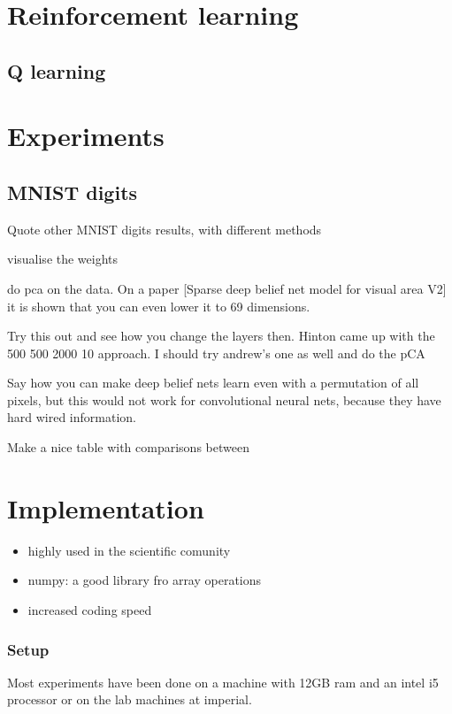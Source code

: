 \documentclass[11pt, fleqn, twoside]{article}
\begin{document}
\section{Reinforcement learning}

\subsection{Q learning}

\section{Experiments}

\subsection{MNIST digits}
  Quote other MNIST digits results, with different methods

  visualise the weights

  do pca on the data. On a paper [Sparse deep belief net model for visual area V2]
  it is shown that you can even lower it to 69 dimensions.

  Try this out and see how you change the layers then.
  Hinton came up with the 500 500 2000 10 approach.
  I should try andrew's one as well and do the pCA

  Say how you can make deep belief nets learn even with a permutation of all pixels, but this would not work for convolutional neural nets, because they have hard wired information.

  Make a nice table with comparisons between

\section{Implementation}

\begin{itemize}
  \item highly used in the scientific comunity
  \item numpy: a good library fro array operations
  \item increased coding speed
\end{itemize}

\subsubsection{Setup}

  Most experiments have been done on a machine with 12GB ram and an intel i5 processor or on the lab machines at imperial.
\end{document}
